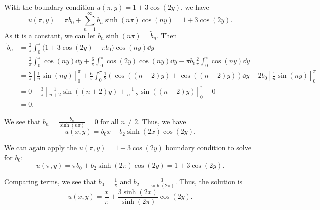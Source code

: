 \documentclass[plain]{pset}
\begin{document}
\begin{solution}
    With the boundary condition \(u(\pi, y) = 1 + 3\cos(2y)\), we have
    \[u(\pi, y) = \pi b_0 + \sum_{n=1}^\infty b_n \sinh(n\pi)\cos(ny) = 1 + 3\cos(2y).\]
    As it is a constant, we can let \(b_n \sinh(n\pi) = \tilde{b}_n\). Then
    \begin{align*}
        \tilde{b}_n & = \frac{2}{\pi} \int_0^\pi \bigl(1 + 3\cos(2y) - \pi b_0\bigr)\cos(ny) \dd y                                                                                                              \\
                    & = \frac{2}{\pi} \int_0^\pi \cos(ny) \dd y + \frac{6}{\pi} \int_0^\pi \cos(2y)\cos(ny) \dd y - \pi b_0 \frac{2}{\pi} \int_0^\pi \cos(ny) \dd y                                             \\
                    & = \frac{2}{\pi} \left[\frac{1}{n}\sin(ny)\right]_0^\pi + \frac{6}{\pi} \int_0^\pi \frac{1}{2}\left(\cos((n+2)y) + \cos((n-2)y)\right) \dd y - 2b_0 \left[\frac{1}{n}\sin(ny)\right]_0^\pi \\
                    & = 0 + \frac{3}{\pi} \left[\frac{1}{n+2}\sin((n+2)y) + \frac{1}{n-2}\sin((n-2)y)\right]_0^\pi - 0                                                                                          \\
                    & = 0.
    \end{align*}

    We see that \(b_n = \frac{\tilde{b}_n}{\sinh(n\pi)} = 0\) for all \(n \neq 2\). Thus, we have
    \[u(x, y) = b_0 x + b_2 \sinh(2x)\cos(2y).\]

    We can again apply the \(u(\pi, y) = 1 + 3\cos(2y)\) boundary condition to solve for \(b_0\):
    \[u(\pi, y) = \pi b_0 + b_2 \sinh(2\pi)\cos(2y) = 1 + 3\cos(2y).\]

    Comparing terms, we see that \(b_0 = \frac{1}{\pi}\) and \(b_2 = \frac{3}{\sinh(2\pi)}\). Thus, the solution is
    \[u(x, y) = \frac{x}{\pi} + \frac{3\sinh(2x)}{\sinh(2\pi)}\cos(2y).\]
\end{solution}

\pagebreak
\end{document}
